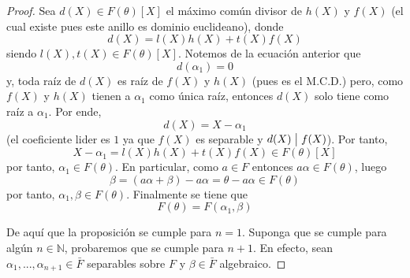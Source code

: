 \documentclass[12pt]{report}
\theoremstyle{largebreak}
\newcommand\divides{\ensuremath{\bigm|}}
\begin{document}
\begin{proof}
        Sea $d(X)\in F(\theta)[X]$ el máximo común divisor de $h(X)$ y $f(X)$ (el cual existe pues este anillo es dominio euclideano), donde
        \begin{equation*}
            d(X)=l(X)h(X)+t(X)f(X)
        \end{equation*}
        siendo $l(X),t(X)\in F(\theta)[X]$. Notemos de la ecuación anterior que
        \begin{equation*}
            d(\alpha_1)=0
        \end{equation*}
        y, toda raíz de $d(X)$ es raíz de $f(X)$ y $h(X)$ (pues es el M.C.D.) pero, como $f(X)$ y $h(X)$ tienen a $\alpha_1$ como única raíz, entonces $d(X)$ solo tiene como raíz a $\alpha_1$. Por ende,
        \begin{equation*}
            d(X)=X-\alpha_1
        \end{equation*}
        (el coeficiente lider es $1$ ya que $f(X)$ es separable y $d(X)\divides f(X)$). Por tanto,
        \begin{equation*}
            X-\alpha_1=l(X)h(X)+t(X)f(X)\in F(\theta)[X]
        \end{equation*}
        por tanto, $\alpha_1\in F(\theta)$. En particular, como $a\in F$ entonces $a\alpha\in F(\theta)$, luego
        \begin{equation*}
            \beta=(a\alpha+\beta)-a\alpha=\theta-a\alpha\in F(\theta)
        \end{equation*}
        por tanto, $\alpha_1,\beta\in F(\theta)$. Finalmente se tiene que
        \begin{equation*}
            F(\theta)=F(\alpha_1,\beta)
        \end{equation*}

        De aquí que la proposición se cumple para $n=1$. Suponga que se cumple para algún $n\in\mathbb{N}$, probaremos que se cumple para $n+1$. En efecto, sean $\alpha_1,...,\alpha_{ n+1}\in\bar{F}$ separables sobre $F$ y $\beta\in\bar{F}$ algebraico.


\end{proof}
\end{document}
